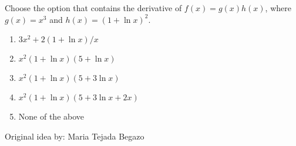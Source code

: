 
Choose the option that contains the derivative of $f(x) = g(x) h(x)$, where $g(x) = x^3$ and $h(x) = (1 + \ln x)^2$.

\begin{enumerate}[label={\Alph*.}]
    \item $3x^2 + 2 (1 + \ln x)/x$
    \item $x^2 (1 + \ln x) (5 + \ln x)$
    \item $x^2 (1 + \ln x) (5 + 3 \ln x)$
    \item $x^2 (1 + \ln x) (5 + 3 \ln x + 2x)$
    \item None of the above
\end{enumerate}

Original idea by: Maria Tejada Begazo
